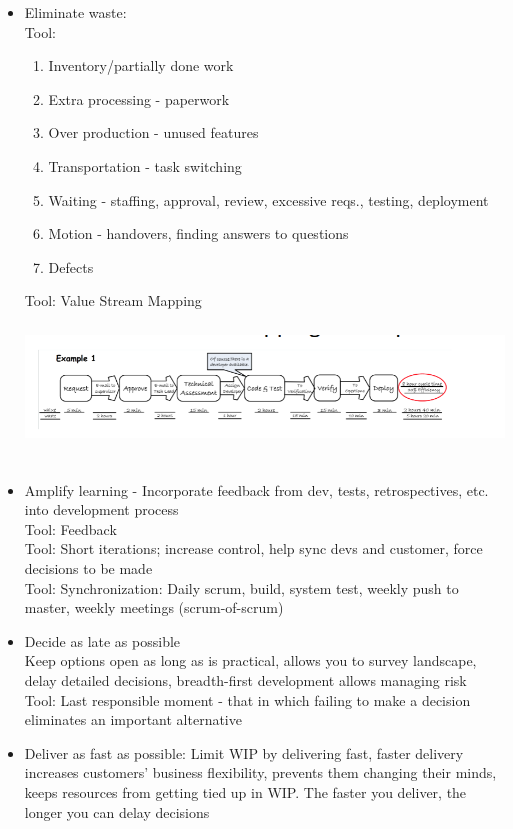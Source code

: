 \documentclass[10pt]{article}
\begin{document}
\begin{itemize}
\item Eliminate waste:\\
Tool: \begin{enumerate}
\item Inventory/partially done work
\item Extra processing - paperwork
\item Over production - unused features
\item Transportation - task switching
\item Waiting - staffing, approval, review, excessive reqs., testing, deployment
\item Motion - handovers, finding answers to questions
\item Defects
\end{enumerate}
Tool: Value Stream Mapping\\
\includegraphics[width=16cm, height=4cm]{VSM}
\item Amplify learning - Incorporate feedback from dev, tests, retrospectives, etc. into development process\\
Tool: Feedback\\
Tool: Short iterations; increase control, help sync devs and customer, force decisions to be made\\
Tool: Synchronization: Daily scrum, build, system test, weekly push to master, weekly meetings (scrum-of-scrum)
\item Decide as late as possible\\
Keep options open as long as is practical, allows you to survey landscape, delay detailed decisions, breadth-first development allows managing risk\\
Tool: Last responsible moment - that in which failing to make a decision eliminates an important alternative
\item Deliver as fast as possible: Limit WIP by delivering fast, faster delivery increases customers' business flexibility, prevents them changing their minds, keeps resources from getting tied up in WIP. The faster you deliver, the longer you can delay decisions\\

\end{itemize}
\end{document}
